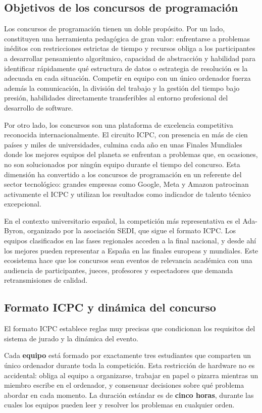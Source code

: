 \subsection{Objetivos de los concursos de programación}

Los concursos de programación tienen un doble propósito. Por un lado, constituyen una herramienta pedagógica de gran valor: enfrentarse a problemas inéditos con restricciones estrictas de tiempo y recursos obliga a los participantes a desarrollar pensamiento algorítmico, capacidad de abstracción y habilidad para identificar rápidamente qué estructura de datos o estrategia de resolución es la adecuada en cada situación. Competir en equipo con un único ordenador fuerza además la comunicación, la división del trabajo y la gestión del tiempo bajo presión, habilidades directamente transferibles al entorno profesional del desarrollo de software.

Por otro lado, los concursos son una plataforma de excelencia competitiva reconocida internacionalmente. El circuito ICPC, con presencia en más de cien países y miles de universidades, culmina cada año en unas Finales Mundiales donde los mejores equipos del planeta se enfrentan a problemas que, en ocasiones, no son solucionados por ningún equipo durante el tiempo del concurso. Esta dimensión ha convertido a los concursos de programación en un referente del sector tecnológico: grandes empresas como Google, Meta y Amazon patrocinan activamente el ICPC y utilizan los resultados como indicador de talento técnico excepcional.

En el contexto universitario español, la competición más representativa es el Ada-Byron, organizado por la asociación SEDI, que sigue el formato ICPC. Los equipos clasificados en las fases regionales acceden a la final nacional, y desde ahí los mejores pueden representar a España en las finales europeas y mundiales. Este ecosistema hace que los concursos sean eventos de relevancia académica con una audiencia de participantes, jueces, profesores y espectadores que demanda retransmisiones de calidad.

\subsection{Formato ICPC y dinámica del concurso}

El formato ICPC establece reglas muy precisas que condicionan los requisitos del sistema de jurado y la dinámica del evento.

Cada \textbf{equipo} está formado por exactamente tres estudiantes que comparten un único ordenador durante toda la competición. Esta restricción de hardware no es accidental: obliga al equipo a organizarse, trabajar en papel o pizarra mientras un miembro escribe en el ordenador, y consensuar decisiones sobre qué problema abordar en cada momento. La duración estándar es de \textbf{cinco horas}, durante las cuales los equipos pueden leer y resolver los problemas en cualquier orden.

